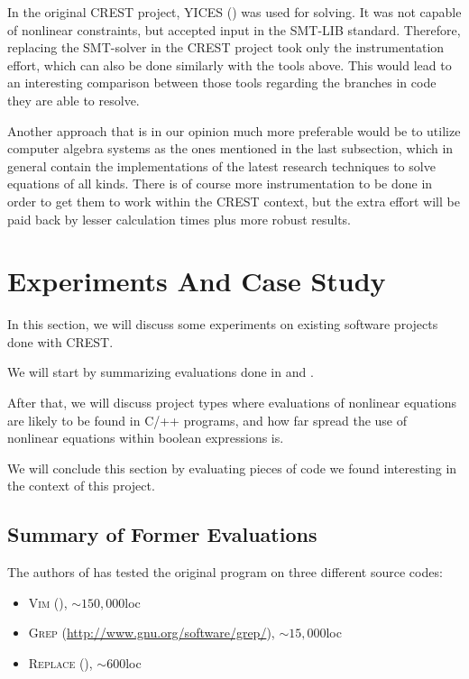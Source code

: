 \documentclass[oribibl]{llncs}
\begin{document}
In the original \textsc{CREST} project, \textsc{YICES} (\cite{dutertre2006yices}) was used for
solving. It was not capable of nonlinear constraints, but accepted
input in the SMT-LIB standard. Therefore, replacing the SMT-solver in
the \textsc{CREST} project took only the instrumentation effort, which
can also be done similarly with the tools above. This would lead to an
interesting comparison between those tools regarding the branches in
code they are able to resolve.

Another approach that is in our opinion much more preferable would be
to utilize computer algebra systems as the ones mentioned in the last subsection, which in general contain the
implementations of the latest research techniques to solve equations
of all kinds. There is of course more instrumentation to be done in
order to get them to work within the \textsc{CREST} context, but the
extra effort will be paid back by lesser calculation times plus more
robust results.


\section{Experiments And Case Study}
\label{sctn:Experiments}

In this section, we will discuss some experiments on existing software
projects done with
\textsc{CREST}.

We will start by summarizing evaluations done in \cite{CREST} and
\cite{CRESTZ3}.

After that, we will discuss project types where evaluations of
nonlinear equations are likely to be found in \textsc{C/++} programs, and how far spread the use
of nonlinear equations within boolean expressions is.

We will conclude this section by evaluating pieces of code we found
interesting in the context of this project.

\subsection{Summary of Former Evaluations}

The authors of \cite{CREST} has tested the original program on three
different source codes:

\begin{itemize}
  \item \textsc{Vim} (\cite{oualline2001vi}), $\sim 150,000$loc
  \item \textsc{Grep} (\url{http://www.gnu.org/software/grep/}), $\sim
    15,000$loc
  \item \textsc{Replace} (\cite{harrold2010siemens}), $\sim 600$loc
\end{itemize}
\end{document}
